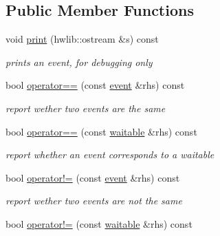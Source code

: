 \subsection*{Public Member Functions}
\begin{DoxyCompactItemize}
\item 
void \hyperlink{classrtos_1_1event_a9f335615e161cabbc504878ef03c3bf3}{print} (hwlib\+::ostream \&s) const \hypertarget{classrtos_1_1event_a9f335615e161cabbc504878ef03c3bf3}{}\label{classrtos_1_1event_a9f335615e161cabbc504878ef03c3bf3}

\begin{DoxyCompactList}\small\item\em prints an event, for debugging only \end{DoxyCompactList}\item 
bool \hyperlink{classrtos_1_1event_a1c0523abc492cb47b4ef37a762ddc442}{operator==} (const \hyperlink{classrtos_1_1event}{event} \&rhs) const \hypertarget{classrtos_1_1event_a1c0523abc492cb47b4ef37a762ddc442}{}\label{classrtos_1_1event_a1c0523abc492cb47b4ef37a762ddc442}

\begin{DoxyCompactList}\small\item\em report wether two events are the same \end{DoxyCompactList}\item 
bool \hyperlink{classrtos_1_1event_a6a8c2497baaddf6c19d045578413f966}{operator==} (const \hyperlink{classrtos_1_1waitable}{waitable} \&rhs) const \hypertarget{classrtos_1_1event_a6a8c2497baaddf6c19d045578413f966}{}\label{classrtos_1_1event_a6a8c2497baaddf6c19d045578413f966}

\begin{DoxyCompactList}\small\item\em report whether an event corresponds to a waitable \end{DoxyCompactList}\item 
bool \hyperlink{classrtos_1_1event_ac90eda8c24bf2915de25166bd2b1411f}{operator!=} (const \hyperlink{classrtos_1_1event}{event} \&rhs) const \hypertarget{classrtos_1_1event_ac90eda8c24bf2915de25166bd2b1411f}{}\label{classrtos_1_1event_ac90eda8c24bf2915de25166bd2b1411f}

\begin{DoxyCompactList}\small\item\em report wether two events are not the same \end{DoxyCompactList}\item 
bool \hyperlink{classrtos_1_1event_ae3dcd2feb206d88ecf03920d60f48a27}{operator!=} (const \hyperlink{classrtos_1_1waitable}{waitable} \&rhs) const \hypertarget{classrtos_1_1event_ae3dcd2feb206d88ecf03920d60f48a27}{}\label{classrtos_1_1event_ae3dcd2feb206d88ecf03920d60f48a27}


\end{DoxyCompactItemize}
